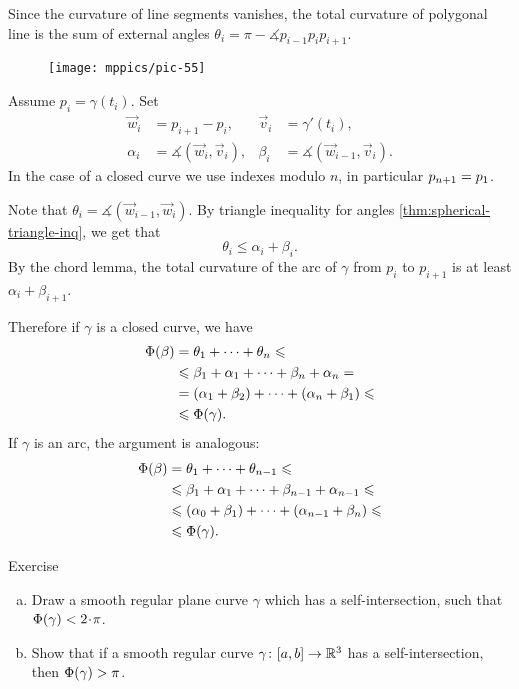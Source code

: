 Since the curvature of line segments vanishes, 
the total curvature of polygonal line is the sum of external angles $\theta_i=\pi-\measuredangle p_{i-1}p_ip_{i+1}$.

\begin{wrapfigure}{o}{40 mm}
\vskip-0mm
\centering
\texttt{[image: mppics/pic-55]}
\vskip0mm
\end{wrapfigure}

Assume $p_i=\gamma(t_i)$.
Set 
\begin{align*}
\vec w_i&=p_{i+1}-p_i,& \vec v_i&=\gamma'(t_i),
\\
\alpha_i&=\measuredangle (\vec w_i,\vec v_i),&\beta_i&=\measuredangle (\vec w_{i-1},\vec v_i).
\end{align*}
In the case of a closed curve we use indexes modulo $n$, in particular $p_{n+1}\z=p_1$.

Note that $\theta_i=\measuredangle (\vec w_{i-1},\vec w_i)$.
By triangle inequality for angles \ref{thm:spherical-triangle-inq}, we get that
\[\theta_i\le \alpha_i+\beta_i.\]
By the chord lemma, the total curvature of the arc of $\gamma$ from $p_i$ to $p_{i+1}$ is at least $\alpha_i+\beta_{i+1}$. 

Therefore if $\gamma$ is a closed curve, we have
\begin{align*}
\Phi({\beta})&=\theta_1+\dots+\theta_n\leqslant 
\\
&\leqslant\beta_1+\alpha_1+\dots+\beta_n+\alpha_n = 
\\
&=(\alpha_1+\beta_2)+\dots+(\alpha_n+\beta_1) \leqslant 
\\
&\leqslant \Phi({\gamma}).
\end{align*}
If $\gamma$ is an arc, the argument is analogous:
\begin{align*}
\Phi({\beta})&=\theta_1+\dots+\theta_{n-1}\leqslant 
\\
&\leqslant\beta_1+\alpha_1+\dots+\beta_{n-1}+\alpha_{n-1} \leqslant
\\
&\leqslant (\alpha_0+\beta_1)+\dots+(\alpha_{n-1}+\beta_n) \leqslant 
\\
&\leqslant \Phi({\gamma}).
\end{align*}
\qedsf

\begin{thm}{Exercise}\label{ex:sef-intersection}
\begin{enumerate}[(a)]
\item Draw a smooth regular plane curve $\gamma$ which has a self-intersection, such that $\tc\gamma<2\cdot\pi$.
\item\label{ex:sef-intersection:>pi} Show that if a smooth regular curve $\gamma\colon[a,b]\to\mathbb{R}^3$ has a self-intersection, then $\Phi({\gamma})>\pi$.
\end{enumerate}
\end{thm}

